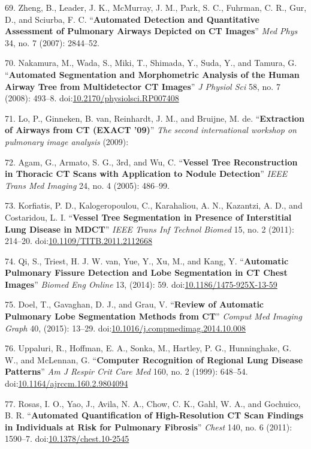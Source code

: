 \documentclass[11pt,]{article}
\begin{document}
69. Zheng, B., Leader, J. K., McMurray, J. M., Park, S. C., Fuhrman, C.
R., Gur, D., and Sciurba, F. C. ``\textbf{Automated Detection and
Quantitative Assessment of Pulmonary Airways Depicted on CT Images}''
\emph{Med Phys} 34, no. 7 (2007): 2844--52.

70. Nakamura, M., Wada, S., Miki, T., Shimada, Y., Suda, Y., and Tamura,
G. ``\textbf{Automated Segmentation and Morphometric Analysis of the
Human Airway Tree from Multidetector CT Images}'' \emph{J Physiol Sci}
58, no. 7 (2008): 493--8.
doi:\href{http://dx.doi.org/10.2170/physiolsci.RP007408}{10.2170/physiolsci.RP007408}

71. Lo, P., Ginneken, B. van, Reinhardt, J. M., and Bruijne, M. de.
``\textbf{Extraction of Airways from CT (EXACT '09)}'' \emph{The second
international workshop on pulmonary image analysis} (2009):

72. Agam, G., Armato, S. G., 3rd, and Wu, C. ``\textbf{Vessel Tree
Reconstruction in Thoracic CT Scans with Application to Nodule
Detection}'' \emph{IEEE Trans Med Imaging} 24, no. 4 (2005): 486--99.

73. Korfiatis, P. D., Kalogeropoulou, C., Karahaliou, A. N., Kazantzi,
A. D., and Costaridou, L. I. ``\textbf{Vessel Tree Segmentation in
Presence of Interstitial Lung Disease in MDCT}'' \emph{IEEE Trans Inf
Technol Biomed} 15, no. 2 (2011): 214--20.
doi:\href{http://dx.doi.org/10.1109/TITB.2011.2112668}{10.1109/TITB.2011.2112668}

74. Qi, S., Triest, H. J. W. van, Yue, Y., Xu, M., and Kang, Y.
``\textbf{Automatic Pulmonary Fissure Detection and Lobe Segmentation in
CT Chest Images}'' \emph{Biomed Eng Online} 13, (2014): 59.
doi:\href{http://dx.doi.org/10.1186/1475-925X-13-59}{10.1186/1475-925X-13-59}

75. Doel, T., Gavaghan, D. J., and Grau, V. ``\textbf{Review of
Automatic Pulmonary Lobe Segmentation Methods from CT}'' \emph{Comput
Med Imaging Graph} 40, (2015): 13--29.
doi:\href{http://dx.doi.org/10.1016/j.compmedimag.2014.10.008}{10.1016/j.compmedimag.2014.10.008}

76. Uppaluri, R., Hoffman, E. A., Sonka, M., Hartley, P. G.,
Hunninghake, G. W., and McLennan, G. ``\textbf{Computer Recognition of
Regional Lung Disease Patterns}'' \emph{Am J Respir Crit Care Med} 160,
no. 2 (1999): 648--54.
doi:\href{http://dx.doi.org/10.1164/ajrccm.160.2.9804094}{10.1164/ajrccm.160.2.9804094}

77. Rosas, I. O., Yao, J., Avila, N. A., Chow, C. K., Gahl, W. A., and
Gochuico, B. R. ``\textbf{Automated Quantification of High-Resolution CT
Scan Findings in Individuals at Risk for Pulmonary Fibrosis}''
\emph{Chest} 140, no. 6 (2011): 1590--7.
doi:\href{http://dx.doi.org/10.1378/chest.10-2545}{10.1378/chest.10-2545}
\end{document}
